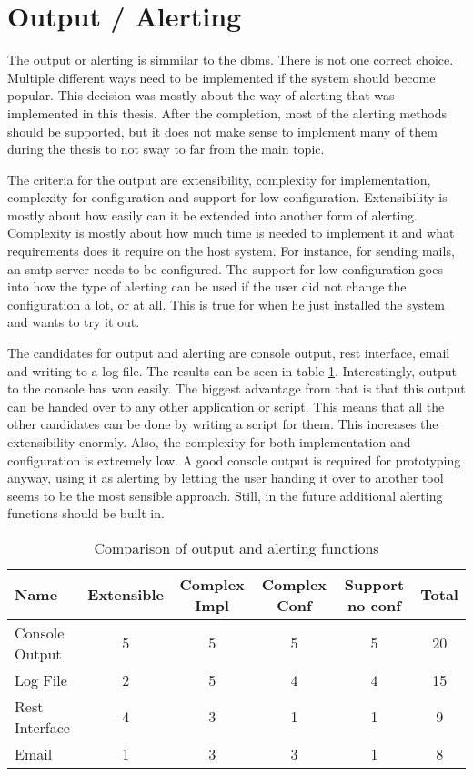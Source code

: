 \section{Output / Alerting}
\label{sec:decisions:output}

The output or alerting is simmilar to the \gls{dbms}. There is not one correct choice. Multiple different ways need to be implemented if the system should become popular. This decision was mostly about the way of alerting that was implemented in this thesis. After the completion, most of the alerting methods should be supported, but it does not make sense to implement many of them during the thesis to not sway to far from the main topic.

The criteria for the output are extensibility, complexity for implementation, complexity for configuration and support for low configuration. Extensibility is mostly about how easily can it be extended into another form of alerting. Complexity is mostly about how much time is needed to implement it and what requirements does it require on the host system. For instance, for sending mails, an smtp server needs to be configured. The support for low configuration goes into how the type of alerting can be used if the user did not change the configuration a lot, or at all. This is true for when he just installed the system and wants to try it out. 

The candidates for output and alerting are console output, rest interface, email and writing to a log file. The results can be seen in table \ref{tab:dec:output}. Interestingly, output to the console has won easily. The biggest advantage from that is that this output can be handed over to any other application or script. This means that all the other candidates can be done by writing a script for them. This increases the extensibility enormly. Also, the complexity for both implementation and configuration is extremely low. A good console output is required for prototyping anyway, using it as alerting by letting the user handing it over to another tool seems to be the most sensible approach. Still, in the future additional alerting functions should be built in.

\begin{table}[!ht]
    \begin{center}
        \caption{Comparison of output and alerting functions}
        \label{tab:dec:output}
        \begin{tabular}{l|c|c|c|c|c}
            \textbf{Name} & \textbf{Extensible} & \textbf{Complex Impl} & \textbf{Complex Conf} & \textbf{Support no conf} & \textbf{Total}\\
        \hline
            Console Output  & 5 & 5 & 5 & 5 & 20 \\
            Log File        & 2 & 5 & 4 & 4 & 15 \\
            Rest Interface  & 4 & 3 & 1 & 1 & 9 \\
            Email           & 1 & 3 & 3 & 1 & 8 \\
        \end{tabular}
    \end{center}
\end{table}